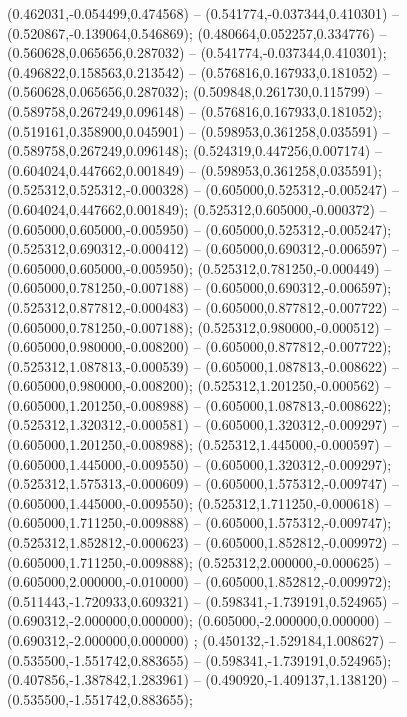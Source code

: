  (0.462031,-0.054499,0.474568) -- (0.541774,-0.037344,0.410301) -- (0.520867,-0.139064,0.546869);
 (0.480664,0.052257,0.334776) -- (0.560628,0.065656,0.287032) -- (0.541774,-0.037344,0.410301);
 (0.496822,0.158563,0.213542) -- (0.576816,0.167933,0.181052) -- (0.560628,0.065656,0.287032);
 (0.509848,0.261730,0.115799) -- (0.589758,0.267249,0.096148) -- (0.576816,0.167933,0.181052);
 (0.519161,0.358900,0.045901) -- (0.598953,0.361258,0.035591) -- (0.589758,0.267249,0.096148);
 (0.524319,0.447256,0.007174) -- (0.604024,0.447662,0.001849) -- (0.598953,0.361258,0.035591);
 (0.525312,0.525312,-0.000328) -- (0.605000,0.525312,-0.005247) -- (0.604024,0.447662,0.001849);
 (0.525312,0.605000,-0.000372) -- (0.605000,0.605000,-0.005950) -- (0.605000,0.525312,-0.005247);
 (0.525312,0.690312,-0.000412) -- (0.605000,0.690312,-0.006597) -- (0.605000,0.605000,-0.005950);
 (0.525312,0.781250,-0.000449) -- (0.605000,0.781250,-0.007188) -- (0.605000,0.690312,-0.006597);
 (0.525312,0.877812,-0.000483) -- (0.605000,0.877812,-0.007722) -- (0.605000,0.781250,-0.007188);
 (0.525312,0.980000,-0.000512) -- (0.605000,0.980000,-0.008200) -- (0.605000,0.877812,-0.007722);
 (0.525312,1.087813,-0.000539) -- (0.605000,1.087813,-0.008622) -- (0.605000,0.980000,-0.008200);
 (0.525312,1.201250,-0.000562) -- (0.605000,1.201250,-0.008988) -- (0.605000,1.087813,-0.008622);
 (0.525312,1.320312,-0.000581) -- (0.605000,1.320312,-0.009297) -- (0.605000,1.201250,-0.008988);
 (0.525312,1.445000,-0.000597) -- (0.605000,1.445000,-0.009550) -- (0.605000,1.320312,-0.009297);
 (0.525312,1.575313,-0.000609) -- (0.605000,1.575312,-0.009747) -- (0.605000,1.445000,-0.009550);
 (0.525312,1.711250,-0.000618) -- (0.605000,1.711250,-0.009888) -- (0.605000,1.575312,-0.009747);
 (0.525312,1.852812,-0.000623) -- (0.605000,1.852812,-0.009972) -- (0.605000,1.711250,-0.009888);
 (0.525312,2.000000,-0.000625) -- (0.605000,2.000000,-0.010000) -- (0.605000,1.852812,-0.009972);
 (0.511443,-1.720933,0.609321) -- (0.598341,-1.739191,0.524965) -- (0.690312,-2.000000,0.000000);
 (0.605000,-2.000000,0.000000) -- (0.690312,-2.000000,0.000000) ;
 (0.450132,-1.529184,1.008627) -- (0.535500,-1.551742,0.883655) -- (0.598341,-1.739191,0.524965);
 (0.407856,-1.387842,1.283961) -- (0.490920,-1.409137,1.138120) -- (0.535500,-1.551742,0.883655);
